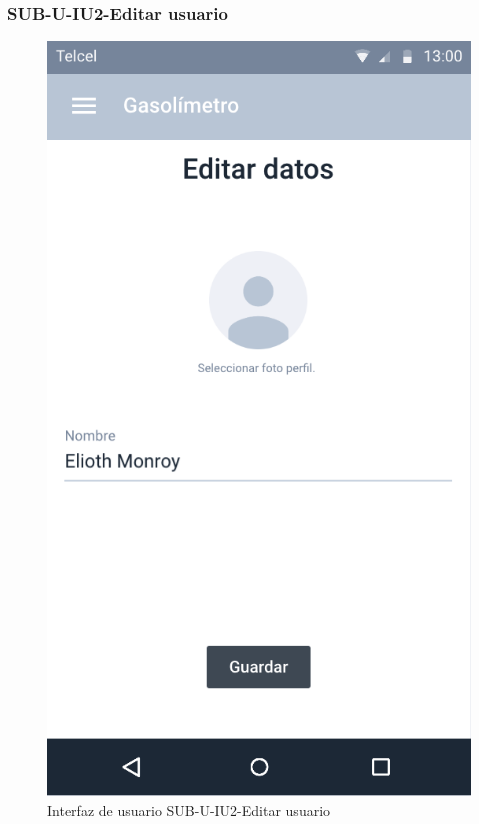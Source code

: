 \subsubsection{SUB-U-IU2-Editar usuario}\label{SUB-U-IU2}
\begin{figure}[H]
	\centering
	\includegraphics[scale=.55]{Capitulo4/software/submodulos/usuarios/images/sub-u-iu2}
	\caption{Interfaz de usuario SUB-U-IU2-Editar usuario}
	\label{fig:sub-u-iu2}
\end{figure}
